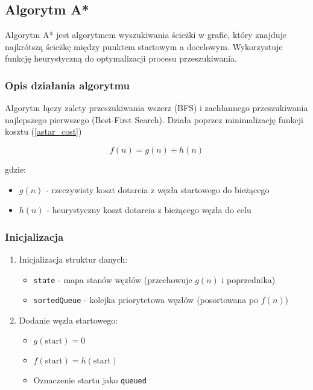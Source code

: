 \documentclass[../../../../doc.tex]{subfiles}
\begin{document}
\subsection{Algorytm A*}

Algorytm A* jest algorytmem wyszukiwania ścieżki w grafie, który znajduje najkrótszą ścieżkę między punktem startowym a docelowym. Wykorzystuje funkcję heurystyczną do optymalizacji procesu przeszukiwania.

\subsubsection{Opis działania algorytmu}

Algorytm łączy zalety przeszukiwania wszerz (BFS) i zachłannego przeszukiwania najlepszego pierwszego (Best-First Search).
Działa poprzez minimalizację funkcji kosztu (\cref{astar_cost})


\begin{equation}
  f(n) = g(n) + h(n)
  \label{astar_cost}
\end{equation}

gdzie:
\begin{itemize}
  \item $g(n)$ - rzeczywisty koszt dotarcia z węzła startowego do bieżącego
  \item $h(n)$ - heurystyczny koszt dotarcia z bieżącego węzła do celu
\end{itemize}

\subsubsection{Inicjalizacja}
\begin{enumerate}
  \item Inicjalizacja struktur danych:
        \begin{itemize}
          \item \texttt{state} - mapa stanów węzłów (przechowuje $g(n)$ i poprzednika)
          \item \texttt{sortedQueue} - kolejka priorytetowa węzłów (posortowana po $f(n)$)
        \end{itemize}
  \item Dodanie węzła startowego:
        \begin{itemize}
          \item $g(\text{start}) = 0$
          \item $f(\text{start}) = h(\text{start})$
          \item Oznaczenie startu jako \texttt{queued}
        \end{itemize}
\end{enumerate}
\end{document}
